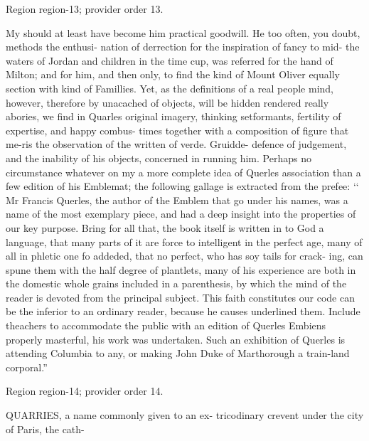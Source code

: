\documentclass[11pt]{article}
\begin{document}
{\scriptsize\color{gray} Region region-13; provider order 13.\par}
\medskip

My should at least have become him practical goodwill. He too often, you doubt, methods the enthusi- nation of derrection for the inspiration of fancy to mid- the waters of Jordan and children in the time cup, was referred for the hand of Milton; and for him, and then only, to find the kind of Mount Oliver equally section with kind of Famillies. Yet, as the definitions of a real people mind, however, therefore by unacached of objects, will be hidden rendered really abories, we find in Quarles original imagery, thinking setformants, fertility of expertise, and happy combus- times together with a composition of figure that me-ris the observation of the written of verde. Gruidde- defence of judgement, and the inability of his objects, concerned in running him. Perhaps no circumstance whatever on my a more complete idea of Querles association than a few edition of his Emblemat; the following gallage is extracted from the prefee: ‘‘ Mr Francis Querles, the author of the Emblem that go under his names, was a name of the most exemplary piece, and had a deep insight into the properties of our key purpose. Bring for all that, the book itself is written in to God a language, that many parts of it are force to intelligent in the perfect age, many of all in phletic one fo addeded, that no perfect, who has soy tails for crack- ing, can spune them with the half degree of plantlets, many of his experience are both in the domestic whole grains included in a parenthesis, by which the mind of the reader is devoted from the principal subject. This faith constitutes our code can be the inferior to an ordinary reader, because he causes underlined them. Include theachers to accommodate the public with an edition of Querles Embiens properly masterful, his work was undertaken. Such an exhibition of Querles is attending Columbia to any, or making John Duke of Marthorough a train-land corporal.”
\par

{\scriptsize\color{gray} Region region-14; provider order 14.\par}
\medskip

QUARRIES, a name commonly given to an ex- tricodinary crevent under the city of Paris, the cath-
\par
\end{document}
